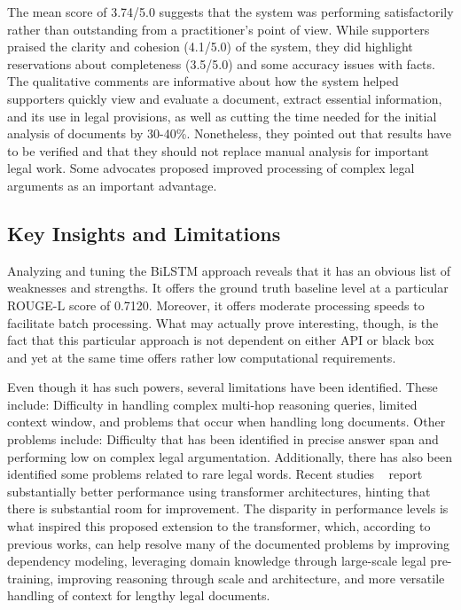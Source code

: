 \documentclass{llncs}
\begin{document}
The mean score of 3.74/5.0 suggests that the system was performing satisfactorily rather than outstanding from a practitioner’s point of view. While supporters praised the clarity and cohesion (4.1/5.0) of the system, they did highlight reservations about completeness (3.5/5.0) and some accuracy issues with facts. The qualitative comments are informative about how the system helped supporters quickly view and evaluate a document, extract essential information, and its use in legal provisions, as well as cutting the time needed for the initial analysis of documents by 30-40\%. Nonetheless, they pointed out that results have to be verified and that they should not replace manual analysis for important legal work. Some advocates proposed improved processing of complex legal arguments as an important advantage.

\subsection{Key Insights and Limitations}
Analyzing and tuning the BiLSTM approach reveals that it has an obvious list of weaknesses and strengths. It offers the ground truth baseline level at a particular ROUGE-L score of 0.7120. Moreover, it offers moderate processing speeds to facilitate batch processing. What may actually prove interesting, though, is the fact that this particular approach is not dependent on either API or black box and yet at the same time offers rather low computational requirements.

Even though it has such powers, several limitations have been identified. These include:
     Difficulty in handling complex multi-hop reasoning queries, limited context window, and problems that occur when handling long documents. Other problems include:
     Difficulty that has been identified in precise answer span and performing low on complex legal argumentation. Additionally, there has also been identified some problems related to rare legal words. Recent studies ~\cite{nigam2023legal,oliveira2025similarity} report substantially better performance using transformer architectures, hinting that there is substantial room for improvement. The disparity in performance levels is what inspired this proposed extension to the transformer, which, according to previous works, can help resolve many of the documented problems by improving dependency modeling, leveraging domain knowledge through large-scale legal pre-training, improving reasoning through scale and architecture, and more versatile handling of context for lengthy legal documents.
\end{document}
